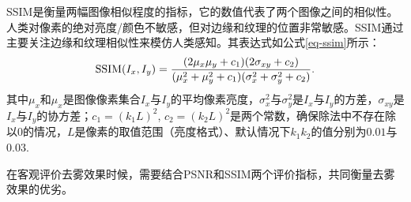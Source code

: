 SSIM是衡量两幅图像相似程度的指标，它的数值代表了两个图像之间的相似性。人类对像素的绝对亮度/颜色不敏感，但对边缘和纹理的位置非常敏感。SSIM通过主要关注边缘和纹理相似性来模仿人类感知。其表达式如公式\eqref{eq-ssim}所示：
\begin{equation}
    \hbox{SSIM}(I_x,I_y) = \frac{(2\mu_x\mu_y + c_1)(2\sigma_{xy} + c_2)}{(\mu_x^2 + \mu_y^2 + c_1)(\sigma_x^2 + \sigma_y^2 + c_2)}.
    \label{eq-ssim}
\end{equation}
其中$\mu_x$和$\mu_x$是图像像素集合$I_x$与$I_y$的平均像素亮度，$\sigma_x^2$与$\sigma_y^2$是$I_x$与$I_y$的方差，$\sigma_{xy}$是$I_x$与$I_y$的协方差；$c_1 = (k_1L)^2$, $c_2 = (k_2L)^2$是两个常数，确保除法中不存在除以0的情况，$L$是像素的取值范围（亮度格式）、默认情况下$ k_1 $$k_2 $的值分别为$0.01$与$0.03$.

在客观评价去雾效果时候，需要结合PSNR和SSIM两个评价指标，共同衡量去雾效果的优劣。
